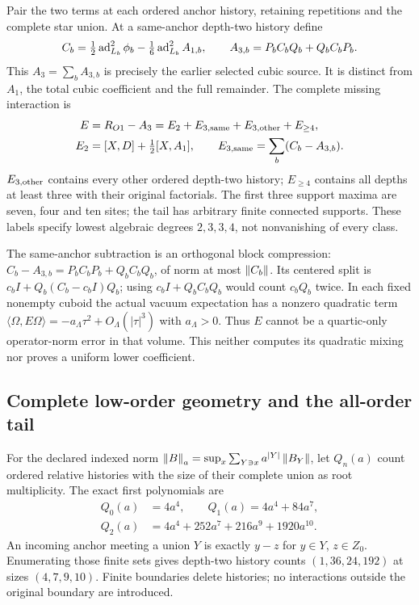 Pair the two terms at each ordered anchor history, retaining repetitions and the complete star union. At a same-anchor depth-two history define
\begin{equation}
C_b=\tfrac12\operatorname{ad}_{L_b}^2\phi_b-\tfrac16\operatorname{ad}_{L_b}^2A_{1,b},\qquad
A_{3,b}=P_bC_bQ_b+Q_bC_bP_b.
\label{ag2:cubic}
\end{equation}
This $A_3=\sum_bA_{3,b}$ is precisely the earlier selected cubic source. It is distinct from $A_1$, the total cubic coefficient and the full remainder. The complete missing interaction is
\begin{align}
E&=R_{O1}-A_3=E_2+E_{3,\rm same}+E_{3,\rm other}+E_{\ge4},\nonumber\\
E_2&=[X,D]+\tfrac12[X,A_1],\qquad
E_{3,\rm same}=\sum_b(C_b-A_{3,b}).
\label{ag2:inventory}
\end{align}
$E_{3,\rm other}$ contains every other ordered depth-two history; $E_{\ge4}$ contains all depths at least three with their original factorials. The first three support maxima are seven, four and ten sites; the tail has arbitrary finite connected supports. These labels specify lowest algebraic degrees $2,3,3,4$, not nonvanishing of every class.

The same-anchor subtraction is an orthogonal block compression:
$C_b-A_{3,b}=P_bC_bP_b+Q_bC_bQ_b$, of norm at most $\left\lVert C_b\right\rVert$. Its centered split is $c_bI+Q_b(C_b-c_bI)Q_b$; using $c_bI+Q_bC_bQ_b$ would count $c_bQ_b$ twice. In each fixed nonempty cuboid the actual vacuum expectation has a nonzero quadratic term
$\langle\Omega,E\Omega\rangle=-a_\Lambda\tau^2+O_\Lambda(|\tau|^3)$ with $a_\Lambda>0$. Thus $E$ cannot be a quartic-only operator-norm error in that volume. This neither computes its quadratic mixing nor proves a uniform lower coefficient.

\subsection{Complete low-order geometry and the all-order tail}
For the declared indexed norm $\left\lVert B\right\rVert_a=\sup_x\sum_{Y\ni x}a^{|Y|}\left\lVert B_Y\right\rVert$, let $Q_n(a)$ count ordered relative histories with the size of their complete union as root multiplicity. The exact first polynomials are
\begin{align}
Q_0(a)&=4a^4,\qquad Q_1(a)=4a^4+84a^7,\nonumber\\
Q_2(a)&=4a^4+252a^7+216a^9+1920a^{10}.
\label{ag2:geometry}
\end{align}
An incoming anchor meeting a union $Y$ is exactly $y-z$ for $y\in Y$, $z\in Z_0$. Enumerating those finite sets gives depth-two history counts $(1,36,24,192)$ at sizes $(4,7,9,10)$. Finite boundaries delete histories; no interactions outside the original boundary are introduced.

